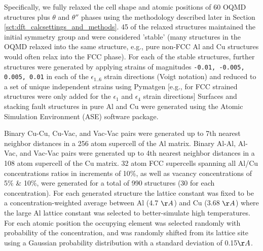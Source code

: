 \documentclass{article}
\begin{document}
Specifically, we fully relaxed the cell shape and atomic positions of 60 OQMD structures plus $\theta$ and $\theta''$ phases using the methodology described later in Section \ref{sct:dft_calcsettings_and_methods}.  45 of the relaxed structures maintained the initial symmetry group and were considered 'stable' (many structures in the OQMD relaxed into the same structure, e.g., pure non-FCC Al and Cu structures would often relax into the FCC phase).
For each of the stable structures, further structures were generated by applying strains of magnitudes \texttt{-0.01, -0.005, 0.005, 0.01} in each of the $\epsilon_{1..6}$ strain directions (Voigt notation) and reduced to a set of unique independent strains using Pymatgen\cite{Ong2013} [e.g., for FCC strained structures were only added for the $\epsilon_1$ and $\epsilon_4$ strain directions]
Surfaces and stacking fault structures in pure Al and Cu were generated using the Atomic Simulation Environment (ASE) software package.

Binary Cu-Cu, Cu-Vac, and Vac-Vac pairs were generated up to 7th nearest neighbor distances in a 256 atom supercell of the Al matrix. 
Binary Al-Al, Al-Vac, and Vac-Vac pairs were generated up to 4th nearest neighbor distances in a 108 atom supercell of the Cu matrix. 
32 atom FCC supercells spanning all Al/Cu concentrations ratios in increments of 10\%, as well as vacancy concentrations of 5\% \& 10\%, were generated for a total of 990 structures (30 for each concentration).
For each generated structure the lattice constant was fixed to be a concentration-weighted average between Al (4.7 $\AA$) and Cu (3.68 $\AA$) where the large Al lattice constant was selected to better-simulate high temperatures. For each atomic position the occupying element was selected randomly with probability of the concentration, and was randomly shifted from its lattice site using  a Gaussian probability distribution with a standard deviation of 0.15$\AA$.
\end{document}
